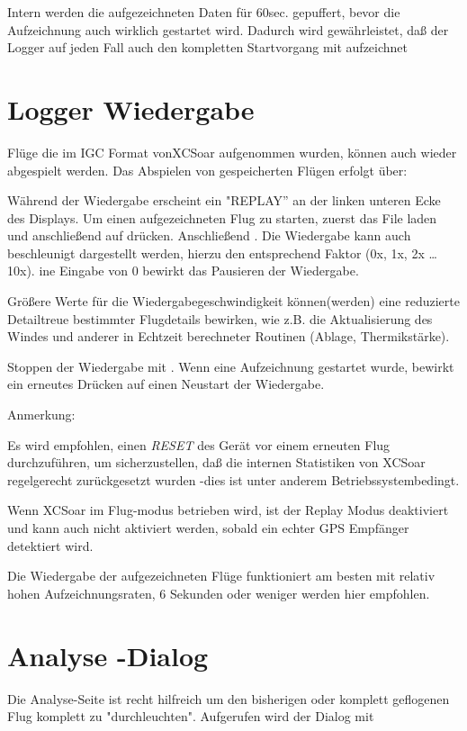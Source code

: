 Intern werden die aufgezeichneten Daten für 60sec. gepuffert, bevor die Aufzeichnung auch wirklich gestartet wird.  Dadurch wird gewährleistet, daß der Logger auf jeden Fall auch den kompletten Startvorgang mit aufzeichnet

\section{Logger Wiedergabe}
Flüge die im IGC Format von\textsf{XCSoar} aufgenommen wurden,  können   auch wieder abgespielt werden. Das Abspielen von gespeicherten Flügen erfolgt über:

Während der Wiedergabe erscheint ein "REPLAY'' an der linken unteren Ecke des Displays.
Um einen aufgezeichneten Flug zu starten, zuerst das File laden und anschließend auf  drücken. Anschließend . Die Wiedergabe kann auch beschleunigt dargestellt werden, hierzu den entsprechend Faktor  (0x, 1x, 2x \dots 10x).
 ine Eingabe von 0 bewirkt das Pausieren der Wiedergabe.

Größere Werte für die Wiedergabegeschwindigkeit können(werden) eine reduzierte Detailtreue  bestimmter Flugdetails bewirken, wie z.B. die Aktualisierung des Windes und anderer in Echtzeit berechneter Routinen (Ablage, Thermikstärke).

Stoppen der Wiedergabe mit  .
Wenn eine Aufzeichnung gestartet wurde, bewirkt ein erneutes Drücken auf  einen Neustart der Wiedergabe.

Anmerkung:

Es wird empfohlen, einen \textsl{RESET}  des  Gerät vor einem erneuten Flug durchzuführen, um sicherzustellen, daß die internen Statistiken von \textsf{XCSoar} regelgerecht zurückgesetzt wurden -dies ist unter anderem Betriebssystembedingt.

Wenn \textsf{XCSoar} im Flug-modus betrieben wird, ist der Replay Modus deaktiviert und kann auch nicht aktiviert werden, sobald ein echter GPS Empfänger detektiert wird.

Die Wiedergabe der aufgezeichneten Flüge funktioniert am besten mit relativ hohen Aufzeichnungsraten, 6 Sekunden oder weniger werden hier empfohlen.

\section{Analyse -Dialog}\label{sec:analysis-dialog-climb}
Die Analyse-Seite ist recht hilfreich um den bisherigen oder komplett geflogenen Flug komplett zu "durchleuchten".  Aufgerufen wird der Dialog mit


